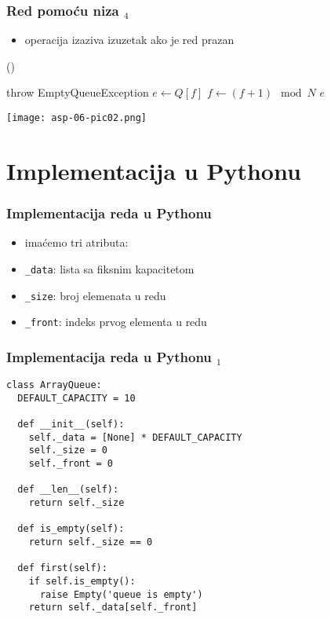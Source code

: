 \documentclass[compress,aspectratio=169]{beamer}
\begin{document}
\begin{frame}[fragile]
  \frametitle{Red pomoću niza $_4$}
  \begin{itemize}
    \item operacija  izaziva izuzetak ako je red prazan
  \end{itemize}
()
\begin{algorithmic}
  \STATE throw EmptyQueueException
\ELSE
  \STATE $e \leftarrow Q[f]$
  \STATE $f \leftarrow (f+1)\mod N$
  \RETURN $e$
\ENDIF
\end{algorithmic}
\begin{center}
  \texttt{[image: asp-06-pic02.png]}
\end{center}
\end{frame}

\section[Python impl]{Implementacija u Pythonu}
\begin{frame}[fragile]
  \frametitle{Implementacija reda u Pythonu}
  \begin{itemize}
    \item imaćemo tri atributa:
    \item \texttt{\_data}: lista sa fiksnim kapacitetom
    \item \texttt{\_size}: broj elemenata u redu
    \item \texttt{\_front}: indeks prvog elementa u redu
  \end{itemize}
\end{frame}

\begin{frame}[fragile,shrink=10]
  \frametitle{Implementacija reda u Pythonu $_1$}
\begin{verbatim}
class ArrayQueue:
  DEFAULT_CAPACITY = 10

  def __init__(self):
    self._data = [None] * DEFAULT_CAPACITY
    self._size = 0
    self._front = 0
    
  def __len__(self):
    return self._size
  
  def is_empty(self):
    return self._size == 0
    
  def first(self):
    if self.is_empty():
      raise Empty('queue is empty')
    return self._data[self._front]

\end{verbatim}
\end{frame}
\end{document}
